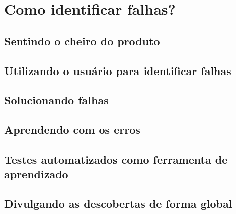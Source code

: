   \section{Como identificar falhas?}
    \subsection{Sentindo o cheiro do produto}
    \subsection{Utilizando o usuário para identificar falhas}
    \subsection{Solucionando falhas}
    \subsection{Aprendendo com os erros}
    \subsection{Testes automatizados como ferramenta de aprendizado}
    \subsection{Divulgando as descobertas de forma global}

